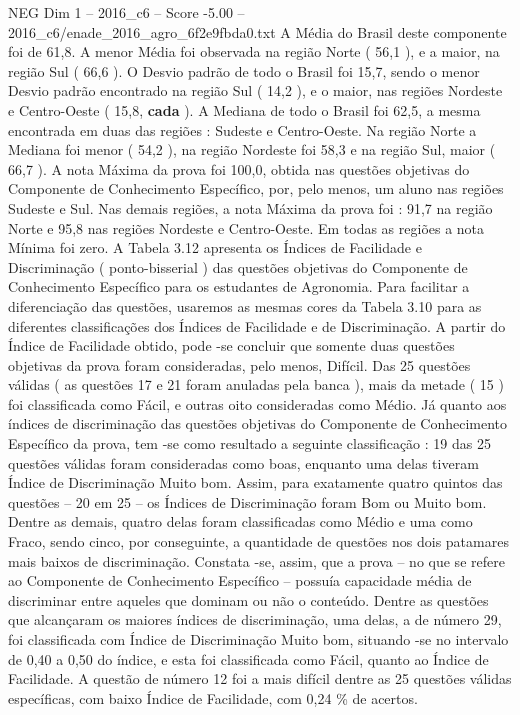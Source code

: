 \begin{textsample}{NEG Dim 1 – 2016\_c6 – Score -5.00 – 2016\_c6/enade\_2016\_agro\_6f2e9fbda0.txt}
A Média do Brasil deste componente foi de 61,8.
A menor Média foi observada na região Norte ( 56,1 ), e a maior, na região Sul ( 66,6 ).
O Desvio padrão de todo o Brasil foi 15,7, sendo o menor Desvio padrão encontrado na região Sul ( 14,2 ), e o maior, nas regiões Nordeste e Centro-Oeste ( 15,8, \textbf{cada} ).
A Mediana de todo o Brasil foi 62,5, a mesma encontrada em duas das regiões : Sudeste e Centro-Oeste.
Na região Norte a Mediana foi menor ( 54,2 ), na região Nordeste foi 58,3 e na região Sul, maior ( 66,7 ).
A nota Máxima da prova foi 100,0, obtida nas questões objetivas do Componente de Conhecimento Específico, por, pelo menos, um aluno nas regiões Sudeste e Sul.
Nas demais regiões, a nota Máxima da prova foi : 91,7 na região Norte e 95,8 nas regiões Nordeste e Centro-Oeste.
Em todas as regiões a nota Mínima foi zero.
A Tabela 3.12 apresenta os Índices de Facilidade e Discriminação ( ponto-bisserial ) das questões objetivas do Componente de Conhecimento Específico para os estudantes de Agronomia.
Para facilitar a diferenciação das questões, usaremos as mesmas cores da Tabela 3.10 para as diferentes classificações dos Índices de Facilidade e de Discriminação.
A partir do Índice de Facilidade obtido, pode -se concluir que somente duas questões objetivas da prova foram consideradas, pelo menos, Difícil.
Das 25 questões válidas ( as questões 17 e 21 foram anuladas pela banca ), mais da metade ( 15 ) foi classificada como Fácil, e outras oito consideradas como Médio.
Já quanto aos índices de discriminação das questões objetivas do Componente de Conhecimento Específico da prova, tem -se como resultado a seguinte classificação : 19 das 25 questões válidas foram consideradas como boas, enquanto uma delas tiveram Índice de Discriminação Muito bom.
Assim, para exatamente quatro quintos das questões – 20 em 25 – os Índices de Discriminação foram Bom ou Muito bom.
Dentre as demais, quatro delas foram classificadas como Médio e uma como Fraco, sendo cinco, por conseguinte, a quantidade de questões nos dois patamares mais baixos de discriminação.
Constata -se, assim, que a prova – no que se refere ao Componente de Conhecimento Específico – possuía capacidade média de discriminar entre aqueles que dominam ou não o conteúdo.
Dentre as questões que alcançaram os maiores índices de discriminação, uma delas, a de número 29, foi classificada com Índice de Discriminação Muito bom, situando -se no intervalo de 0,40 a 0,50 do índice, e esta foi classificada como Fácil, quanto ao Índice de Facilidade.
A questão de número 12 foi a mais difícil dentre as 25 questões válidas específicas, com baixo Índice de Facilidade, com 0,24 \% de acertos.

\end{textsample}
